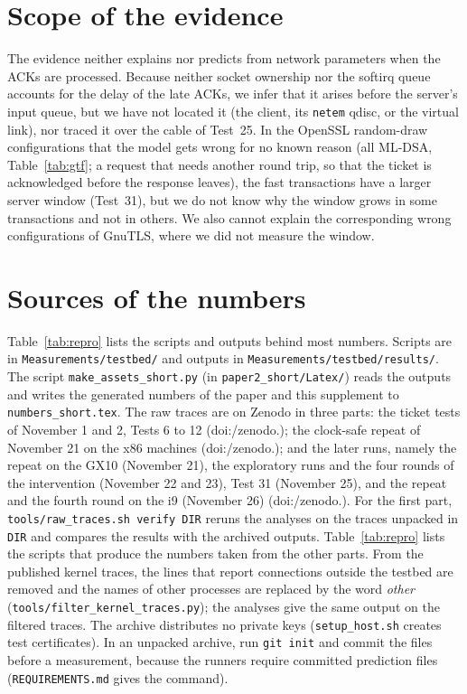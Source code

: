 \documentclass[9pt]{article}
\begin{document}
\section*{Scope of the evidence}
The evidence neither explains nor predicts from network parameters when the ACKs are processed. Because neither socket ownership nor the softirq queue accounts for the delay of the late ACKs, we infer that it arises before the server's input queue, but we have not located it (the client, its \texttt{netem} qdisc, or the virtual link), nor traced it over the cable of Test~25. In the OpenSSL random-draw configurations that the model gets wrong for no known reason (all ML-DSA, Table~\ref{tab:gtf}; a request that needs another round trip, so that the ticket is acknowledged before the response leaves), the fast transactions have a larger server window (Test~31), but we do not know why the window grows in some transactions and not in others. We also cannot explain the corresponding wrong configurations of GnuTLS, where we did not measure the window.

\section*{Sources of the numbers}
Table~\ref{tab:repro} lists the scripts and outputs behind most numbers. Scripts are in \texttt{Measurements/testbed/} and outputs in \texttt{Measurements/testbed/results/}. The script \texttt{make\_assets\_short.py} (in \texttt{paper2\_short/Latex/}) reads the outputs and writes the generated numbers of the paper and this supplement to \texttt{numbers\_short.tex}. The raw traces are on Zenodo in three parts: the ticket tests of November 1 and 2, Tests 6 to 12 (doi:/\allowbreak zenodo.); the clock-safe repeat of November 21 on the x86 machines (doi:/\allowbreak zenodo.); and the later runs, namely the repeat on the GX10 (November 21), the exploratory runs and the four rounds of the intervention (November 22 and 23), Test 31 (November 25), and the repeat and the fourth round on the i9 (November 26) (doi:/\allowbreak zenodo.). For the first part, \texttt{tools/raw\_traces.sh verify DIR} reruns the analyses on the traces unpacked in \texttt{DIR} and compares the results with the archived outputs. Table~\ref{tab:repro} lists the scripts that produce the numbers taken from the other parts. From the published kernel traces, the lines that report connections outside the testbed are removed and the names of other processes are replaced by the word \emph{other} (\texttt{tools/filter\_kernel\_traces.py}); the analyses give the same output on the filtered traces. The archive distributes no private keys (\texttt{setup\_host.sh} creates test certificates). In an unpacked archive, run \texttt{git init} and commit the files before a measurement, because the runners require committed prediction files (\texttt{REQUIREMENTS.md} gives the command).
\end{document}
